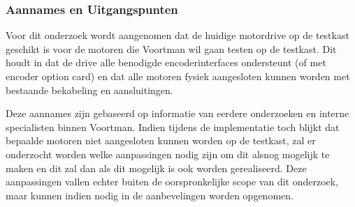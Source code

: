 \subsubsection{Aannames en Uitgangspunten}

Voor dit onderzoek wordt aangenomen dat de huidige motordrive op de testkast geschikt is voor de motoren die Voortman wil gaan testen op de testkast. Dit houdt in dat de drive alle benodigde encoderinterfaces ondersteunt (of met encoder option card) en dat alle motoren fysiek aangesloten kunnen worden met bestaande bekabeling en aansluitingen.

\vspace{0.5cm}

Deze aannames zijn gebaseerd op informatie van eerdere onderzoeken en interne specialisten binnen Voortman. Indien tijdens de implementatie toch blijkt dat bepaalde motoren niet aangesloten kunnen worden op de testkast, zal er onderzocht worden welke aanpassingen nodig zijn om dit alsnog mogelijk te maken en dit zal dan als dit mogelijk is ook worden gerealiseerd. Deze aanpassingen vallen echter buiten de oorspronkelijke scope van dit onderzoek, maar kunnen indien nodig in de aanbevelingen worden opgenomen.


